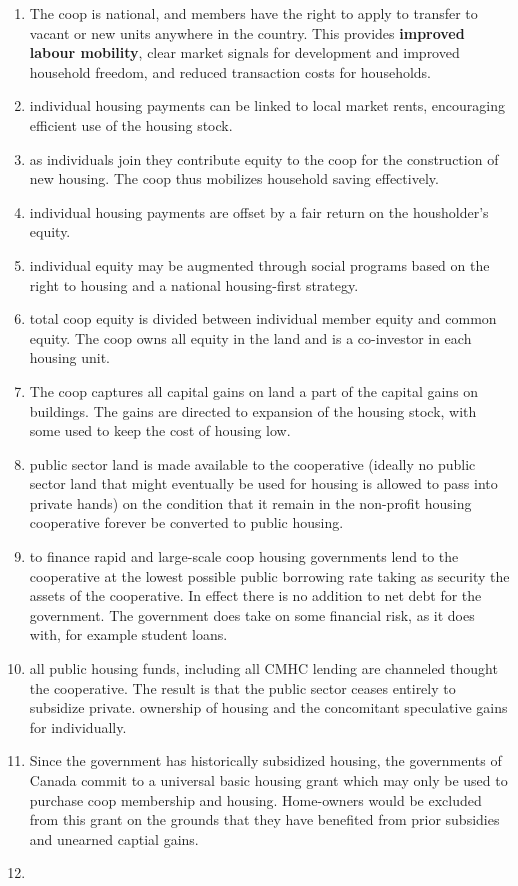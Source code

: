  \begin{enumerate}
     \item The coop is national, and members have the right to apply to transfer to vacant or new units anywhere in the country. This provides \textbf{improved labour mobility}, clear market signals for development and improved household freedom, and reduced transaction costs for households.
     \item individual housing payments can be linked to local market rents, encouraging efficient use of the housing stock. 

     \item  as  individuals join they contribute equity to the coop for the construction of new housing. The coop thus mobilizes household saving effectively. 
 \item individual housing payments are offset by a fair return on the  housholder's equity. 
    \item individual equity may be augmented through social programs based on the right to housing and a national housing-first strategy. 
    
     \item total coop equity is divided between individual member equity and common equity. The coop owns all equity in the land and is a co-investor in each housing unit. 
     \item The coop captures all capital gains on land a part of the capital gains on buildings. The gains are directed to expansion of the housing stock, with some used to keep the cost of housing low.
     
 
     \item public sector land is made available to the cooperative (ideally no public sector land that might eventually be used for housing is allowed to pass into private hands) on the condition that it remain in the non-profit housing cooperative forever be converted to public housing. 
     \item to finance rapid and large-scale coop housing governments lend to the cooperative at the lowest possible public borrowing rate taking as security the assets of the cooperative. In effect there is no addition to net debt for the government. The government does take on some financial risk, as it does with, for example student loans.
     \item all public housing funds, including all CMHC lending  are channeled thought the cooperative. The result is that the public sector ceases entirely to subsidize private. ownership of housing and the concomitant speculative gains for individually.
     \item Since the government has historically subsidized housing, the governments of Canada commit to a universal basic housing grant which may only be used to purchase coop membership and housing. Home-owners would be excluded from this grant on the grounds that they have benefited from prior subsidies and unearned captial gains.
     \item  
     
     \end{enumerate}

